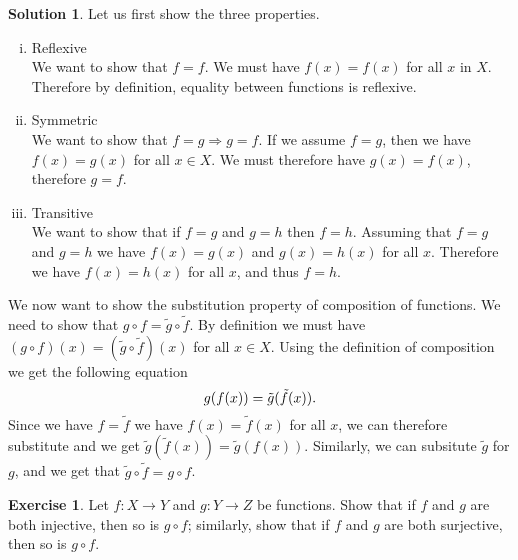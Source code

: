 \documentclass[a4paper, twocolumn]{report}
\newcounter{exercise} \numberwithin{exercise}{section}
\theoremstyle{definition}
\newtheorem{exc}[exercise]{Exercise}
\theoremstyle{solution}
\newtheorem*{sltn}{Solution}
\begin{document}
\begin{sltn}
  Let us first show the three properties.
  \begin{enumerate}[(i)]
    \item Reflexive \\
      [0.2cm]
      We want to show that $f = f$.
      We must have $f(x) = f(x)$ for all $x$ in $X$.
      Therefore by definition, equality between functions is reflexive.

    \item Symmetric \\
      [0.2cm]
      We want to show that $f = g \Rightarrow g = f$.  If we assume $f = g$,
      then we have $f(x) = g(x)$ for all $x \in X$.  We must therefore have
      $g(x) = f(x)$, therefore $g = f$.

    \item Transitive \\
      [0.2cm]
      We want to show that if $f = g$ and $g = h$ then $f = h$.  Assuming that
      $f = g$ and $g = h$ we have $f(x) = g(x)$ and $g(x) = h(x)$ for all $x$.
      Therefore we have $f(x) = h(x)$ for all $x$, and thus $f = h$.
  \end{enumerate}

  We now want to show the substitution property of composition of functions.
  We need to show that $g\circ f = \tilde{g}\circ\tilde{f}$. By definition we
  must have $(g \circ f)(x) = (\tilde{g}\circ\tilde{f})(x)$ for all $x \in X$.
  Using the definition of composition we get the following equation 
  \begin{equation}
    \notag
    g(f(x)) = \tilde{g}(\tilde{f}(x)).
  \end{equation}
  Since we have $f = \tilde{f}$ we have $f(x) = \tilde{f}(x)$ for all $x$, we
  can therefore substitute and we get $\tilde{g}(\tilde{f}(x)) =
  \tilde{g}(f(x))$. Similarly, we can subsitute $\tilde{g}$ for $g$, and we get
  that $\tilde{g}\circ\tilde{f} = g \circ f$.
\end{sltn}

\begin{exc}
  Let $f: X \rightarrow Y$ and $g : Y \rightarrow Z$ be functions. Show that if
  $f$ and $g$ are both injective, then so is $g \circ f$; similarly, show that
  if $f$ and $g$ are both surjective, then so is $g \circ f$. 
\end{exc}
\end{document}

